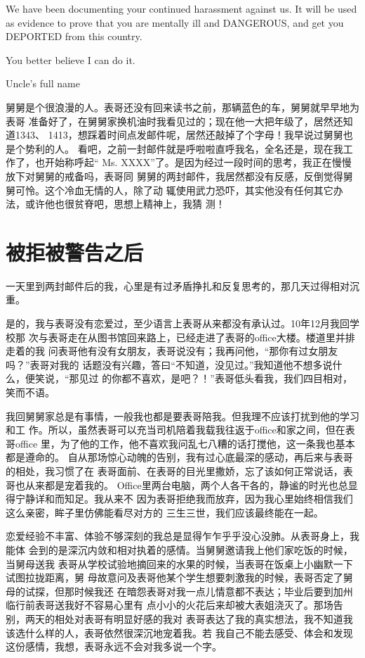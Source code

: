 \documentclass[12pt]{book}
\begin{document}
We have been documenting your continued harassment
against us. It will be used as evidence to prove
that you are mentally ill and DANGEROUS, and get you
DEPORTED from this country.

You better believe I can do it.

Uncle’s full name

舅舅是个很浪漫的人。表哥还没有回来读书之前，那辆蓝色的车，舅舅就早早地为表哥
准备好了，在舅舅家换机油时我看见过的；现在他一大把年级了，居然还知道1343、
1413，想踩着时间点发邮件呢，居然还敲掉了个字母！我早说过舅舅也是个势利的人。
看吧，之前一封邮件就是呼啦啦直呼我名，全名还是，现在我工作了，也开始称呼起“
Ms. XXXX”了。是因为经过一段时间的思考，我正在慢慢放下对舅舅的戒备吗，表哥同
舅舅的两封邮件，我居然都没有反感，反倒觉得舅舅可怜。这个冷血无情的人，除了动
辄使用武力恐吓，其实他没有任何其它办法，或许他也很贫脊吧，思想上精神上，我猜
测！
\section{被拒被警告之后}
\label{sec-9-71}

一天里到两封邮件后的我，心里是有过矛盾挣扎和反复思考的，那几天过得相对沉重。

是的，我与表哥没有恋爱过，至少语言上表哥从来都没有承认过。10年12月我回学校那
次与表哥走在从图书馆回来路上，已经走进了表哥的office大楼。楼道里并排走着的我
问表哥他有没有女朋友，表哥说没有；我再问他，“那你有过女朋友吗？”表哥对我的
话题没有兴趣，答曰“不知道，没见过。”我知道他不想多说什么，便笑说，“那见过
的你都不喜欢，是吧？！”表哥低头看我，我们四目相对，笑而不语。

我回舅舅家总是有事情，一般我也都是要表哥陪我。但我理不应该打扰到他的学习和工
作。所以，虽然表哥可以充当司机陪着我载我往返于office和家之间，但在表哥office
里，为了他的工作，他不喜欢我问乱七八糟的话打搅他，这一条我也基本都是遵命的。
自从那场惊心动魄的告别，我有过心底最深的感动，再后来与表哥的相处，我习惯了在
表哥面前、在表哥的目光里撒娇，忘了该如何正常说话，表哥也从来都是宠着我的。
Office里两台电脑，两个人各干各的，静谧的时光也总显得宁静详和而知足。我从来不
因为表哥拒绝我而放弃，因为我心里始终相信我们这么亲密，眸子里仿佛能看尽对方的
三生三世，我们应该最终能在一起。

恋爱经验不丰富、体验不够深刻的我总是显得乍乍乎乎没心没肺。从表哥身上，我能体
会到的是深沉内敛和相对执着的感情。当舅舅邀请我上他们家吃饭的时候，当舅母送我
表哥从学校试验地摘回来的水果的时候，当表哥在饭桌上小幽默一下试图拉拢距离，舅
母故意问及表哥他某个学生想要刺激我的时候，表哥否定了舅母的试探，但那时候我还
在暗怨表哥对我一点儿情意都不表达；毕业后要到加州临行前表哥送我好不容易心里有
点小小的火花后来却被大表姐浇灭了。那场告别，两天的相处对表哥有明显好感的我对
表哥表达了我的真实想法，我不知道我该选什么样的人，表哥依然很深沉地宠着我。若
我自己不能去感受、体会和发现这份感情，我想，表哥永远不会对我多说一个字。
\end{document}
